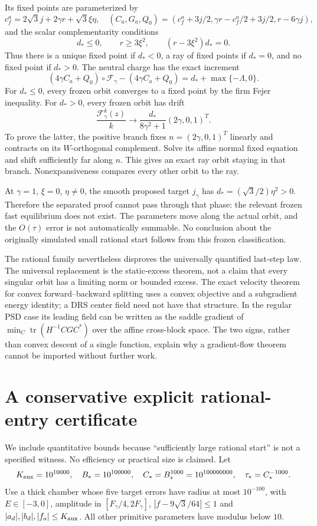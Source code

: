 \documentclass[11pt]{article}
\theoremstyle{remark}\newtheorem{remark}[theorem]{Remark}
\newcommand{\tr}{\operatorname{tr}}\newcommand{\dist}{\operatorname{dist}}
\numberwithin{equation}{section}
\begin{document}
Its fixed points are parameterized by
\[
 c_f^a=2\sqrt3j+2\gamma r+\sqrt3\xi\eta,\quad
 (C_a,G_a,Q_0)=(c_f^a+3j/2,\gamma r-c_f^a/2+3j/2,r-6\gamma j),
\]
and the scalar complementarity conditions
\[
 d_*\leq0,\qquad r\geq3\xi^2,\qquad (r-3\xi^2)d_*=0.
\]
Thus there is a unique fixed point if $d_*<0$, a ray of fixed points if $d_*=0$, and no fixed point if $d_*>0$. The neutral charge has the exact increment
\begin{equation}\label{eq:neutral}
 (4\gamma C_a+Q_0)\circ\mathcal F_\gamma-(4\gamma C_a+Q_0)
 =d_*+\max\{-\Lambda,0\}.
\end{equation}
For $d_*\leq0$, every frozen orbit converges to a fixed point by the firm Fejer inequality. For $d_*>0$, every frozen orbit has drift
\[
 \frac{\mathcal F_\gamma^k(z)}k\longrightarrow
 \frac{d_*}{8\gamma^2+1}(2\gamma,0,1)^T.
\]
To prove the latter, the positive branch fixes $n=(2\gamma,0,1)^T$ linearly and contracts on its $W$-orthogonal complement. Solve its affine normal fixed equation and shift sufficiently far along $n$. This gives an exact ray orbit staying in that branch. Nonexpansiveness compares every other orbit to the ray.

At $\gamma=1$, $\xi=0$, $\eta\ne0$, the smooth proposed target $j_\gamma$ has $d_*=(\sqrt3/2)\eta^2>0$. Therefore the separated proof cannot pass through that phase: the relevant frozen fast equilibrium does not exist. The parameters move along the actual orbit, and the $O(\tau)$ error is not automatically summable. No conclusion about the originally simulated small rational start follows from this frozen classification.

The rational family nevertheless disproves the universally quantified last-step law. The universal replacement is the static-excess theorem, not a claim that every singular orbit has a limiting norm or bounded excess. The exact velocity theorem for convex forward--backward splitting uses a convex objective and a subgradient energy identity; a DRS center field need not have that structure. In the regular PSD case its leading field can be written as the saddle gradient of $\min_C\tr(H^{-1}CGC^*)$ over the affine cross-block space. The two signs, rather than convex descent of a single function, explain why a gradient-flow theorem cannot be imported without further work.

\appendix
\section{A conservative explicit rational-entry certificate}\label{app:witness}
We include quantitative bounds because ``sufficiently large rational start'' is not a specified witness. No efficiency or practical size is claimed. Let
\[
 K_{\rm aux}=10^{10000},\quad B_*=10^{100000},\quad
 C_*=B_*^{1000}=10^{100000000},\quad\tau_*=C_*^{-1000}.
\]
Use a thick chamber whose five target errors have radius at most $10^{-100}$, with $E\in[-3,0]$, amplitude in $[F_\gamma/4,2F_\gamma]$, $|f-9\sqrt3/64|\leq1$ and $|a_d|,|b_d|,|f_a|\leq K_{\rm aux}$. All other primitive parameters have modulus below $10$.
\end{document}
